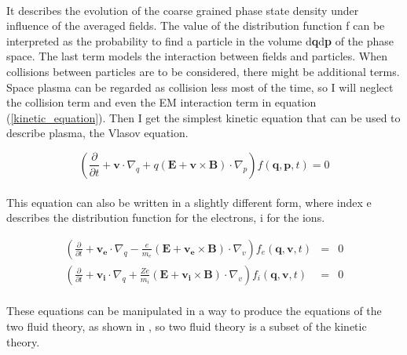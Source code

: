 \documentclass[a4paper,10pt]{report}
\begin{document}
\paragraph*{}
It describes the evolution of the coarse grained phase state density under influence of the averaged fields. The value of the distribution function f can be interpreted as the probability to find a particle in the volume d\textbf{q}d\textbf{p} of the phase space. The last term models the interaction between fields and particles. When collisions between particles are to be considered, there might be additional terms. Space plasma can be regarded as collision less most of the time, so I will neglect the collision term and even the EM interaction term in equation (\ref{kinetic_equation}). Then I get the simplest kinetic equation that can be used to describe plasma, the Vlasov equation.

\begin{equation}\label{vlasov1}
    \left( \frac{\partial}{\partial t} + \mathbf{v}\cdot \nabla_q+q(\mathbf{E}+\mathbf{v}\times \mathbf{B})\cdot\nabla_p \right) f(\mathbf{q,p},t) =0
\end{equation}

\paragraph*{}
This equation can also be written in a slightly different form, where index e describes the distribution function for the electrons, i for the ions.

\begin{eqnarray}
  \left( \frac{\partial}{\partial t} + \mathbf{v_e}\cdot \nabla_q-\frac{e}{m_e}(\mathbf{E}+\mathbf{v_e}\times \mathbf{B})\cdot\nabla_v \right) f_e(\mathbf{q,v},t) &=& 0 \label{vlasov_e}\\
\left( \frac{\partial}{\partial t} + \mathbf{v_i}\cdot \nabla_q+\frac{Ze}{m_i}(\mathbf{E}+\mathbf{v_i}\times \mathbf{B})\cdot\nabla_v \right) f_i(\mathbf{q,v},t) &=& 0\label{vlasov_i}\end{eqnarray}

\paragraph*{}
These equations can be manipulated in a way to produce the equations of the two fluid theory, as shown in \cite{kippenhahn}, so two fluid theory is a subset of the kinetic theory.
\end{document}
